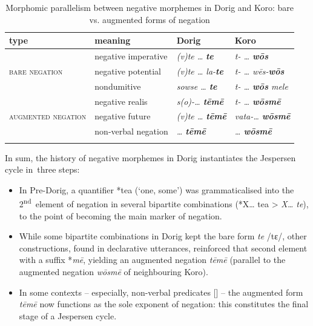 \documentclass[output=paper,colorlinks,citecolor=brown,draft]{langscibook}
\begin{document}
\begin{table}\small
\begin{tabularx}{\textwidth}{llll}
\lsptoprule
{type} & {meaning} & {Dorig} & {Koro}\\
\midrule 
\multirow{3}{*}{\scshape bare negation} & negative imperative & \textit{(v)te …} \textbf{\textit{te}} & \textit{t- … \textbf{wōs}}\\
 & negative potential & \textit{(v)te … la-}\textbf{\textit{te}} & \textit{t- … wēs-}\textbf{\textit{wōs}}\\
 & nondumitive & \textit{sowse … \textbf{te}} & \textit{t- … \textbf{wōs} mele}\\
\midrule 
\multirow{3}{*}{\scshape augmented negation} & negative realis & \textit{s(o)-… \textbf{tēmē}} & \textit{t- … \textbf{wōsmē}}\\
& negative future & \textit{(v)te … \textbf{tēmē}} & \textit{vata-… \textbf{wōsmē}}\\
& non-verbal negation & \textit{… \textbf{tēmē}} & \textit{… \textbf{wōsmē}}\\
\lspbottomrule
\end{tabularx}
    \caption{Morphomic parallelism between negative morphemes in Dorig and Koro: bare vs. augmented forms of negation}
    \label{tab:dor:koro}
\end{table}

\largerpage
In sum, the history of negative morphemes in Dorig instantiates the Jespersen cycle in~three steps:

\begin{itemize}
    \item In Pre-Dorig, a quantifier *tea (‘one, some’) was grammaticalised into the 2\textsuperscript{nd}~element of negation in several bipartite combinations (*X… tea > \textit{X… te}), to the point of becoming the main marker of negation.
    \item While some bipartite combinations in Dorig kept the bare form \textit{te} /tɛ/, other constructions, found in declarative utterances, reinforced that \mbox{second} element with a suffix *\textit{mē}, yielding an augmented negation \textit{tēmē} (\mbox{parallel} to the augmented negation \textit{wōsmē} of neighbouring Koro).
    \item In some contexts – especially, non-verbal predicates [] – the augmented form \textit{tēmē} now functions as the sole exponent of negation: this constitutes the final stage of a Jespersen cycle.
\end{itemize}
\end{document}
